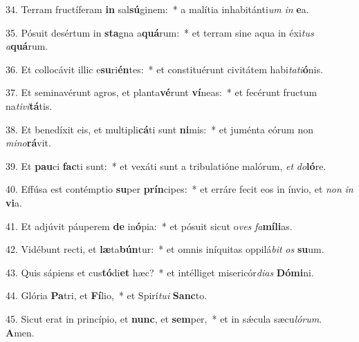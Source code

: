 34. Terram fructíferam \textbf{in} sal\textbf{sú}ginem:~*  a malítia inhabitánti\textit{um} \textit{in} \textbf{e}a.\

35. Pósuit desértum in \textbf{sta}gna a\textbf{quá}rum:~*  et terram sine aqua in éxi\textit{tus} \textit{a}\textbf{quá}rum.\

36. Et collocávit illic e\textbf{su}ri\textbf{én}tes:~*  et constituérunt civitátem habi\textit{ta}\textit{ti}\textbf{ó}nis.\

37. Et seminavérunt agros, et planta\textbf{vé}runt \textbf{ví}neas:~*  et fecérunt fructum na\textit{ti}\textit{vi}\textbf{tá}tis.\

38. Et benedíxit eis, et multipli\textbf{cá}ti sunt \textbf{ni}mis:~*  et juménta eórum non \textit{mi}\textit{no}\textbf{rá}vit.\

39. Et \textbf{pau}ci \textbf{fac}ti sunt:~*  et vexáti sunt a tribulatióne malórum, \textit{et} \textit{do}\textbf{ló}re.\

40. Effúsa est contémptio \textbf{su}per \textbf{prín}cipes:~*  et erráre fecit eos in ínvio, et \textit{non} \textit{in} \textbf{vi}a.\

41. Et adjúvit páuperem \textbf{de} in\textbf{ó}pia:~*  et pósuit sicut o\textit{ves} \textit{fa}\textbf{mí}\textbf{li}as.\

42. Vidébunt recti, et \textbf{læ}ta\textbf{bún}tur:~*  et omnis iníquitas oppilá\textit{bit} \textit{os} \textbf{su}um.\

43. Quis sápiens et cus\textbf{tó}di\textbf{et} hæc?~*  et intélliget misericór\textit{di}\textit{as} \textbf{Dó}\textbf{mi}ni.\

44. Glória \textbf{Pa}tri, et \textbf{Fí}lio,~*  et Spirí\textit{tu}\textit{i} \textbf{Sanc}to.\

45. Sicut erat in princípio, et \textbf{nunc}, et \textbf{sem}per,~*  et in sǽcula sæcu\textit{ló}\textit{rum}. \textbf{A}men.\

